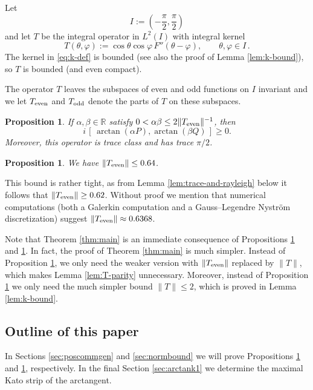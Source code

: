\documentclass[11pt]{article}
\newtheorem{proposition}[theorem]{Proposition}
\theoremstyle{definition}
\theoremstyle{remark}
\newcommand{\R}{\mathbb{R}}
\begin{document}
Let
\[
I:=\left(-\frac{\pi}{2},\frac{\pi}{2}\right)
\]
and let $T$ be the integral operator in $L^2(I)$ with integral kernel
\begin{equation}\label{eq:k-def}
T(\theta,\varphi)
:=\cos\theta\cos\varphi\,F''(\theta-\varphi),
\qquad \theta,\varphi\in I \,.
\end{equation}
The kernel in \eqref{eq:k-def} is bounded (see also the proof of Lemma \ref{lem:k-bound}), so $T$ is bounded (and even compact).

The operator $T$ leaves the subspaces of even and odd functions on $I$ invariant and we let $T_{\rm even}$ and $T_{\rm odd}$ denote the parts of $T$ on these subspaces.

\begin{proposition}\label{prop:poscommgen}
If $\alpha,\beta\in\R$ satisfy $0<\alpha\beta\leq 2\|T_{\rm even}\|^{-1}$, then
\[
i\,[\,\arctan(\alpha P),\arctan(\beta Q)\,]\geq0.
\]
Moreover, this operator is trace class and has trace
$\pi/2$.
\end{proposition}

\begin{proposition}\label{prop:normbound}
    We have $\|T_{\rm even}\| \leq 0.64$.
\end{proposition}

This bound is rather tight, as from Lemma \ref{lem:trace-and-rayleigh} below it follows that $\|T_{\rm even}\|\geq 0.62$. Without proof we mention that numerical computations (both a Galerkin computation and a Gauss--Legendre Nystr\"om discretization) suggest $\|T_{\rm even}\|\approx 0.6368$.

Note that Theorem \ref{thm:main} is an immediate consequence of Propositions \ref{prop:poscommgen} and \ref{prop:normbound}. In fact, the proof of Theorem \ref{thm:main} is much simpler. Instead of Proposition \ref{prop:poscommgen}, we only need the weaker version with $\|T_{\rm even}\|$ replaced by $\|T\|$, which makes Lemma \ref{lem:T-parity} unnecessary. Moreover, instead of Proposition \ref{prop:normbound} we only need the much simpler bound $\|T\|\leq 2$, which is proved in Lemma \ref{lem:k-bound}. 



\subsection*{Outline of this paper}

In Sections \ref{sec:poscommgen} and \ref{sec:normbound} we will prove Propositions \ref{prop:poscommgen} and \ref{prop:normbound}, respectively. In the final Section \ref{sec:arctank1} we determine the maximal Kato strip of the arctangent.
\end{document}
